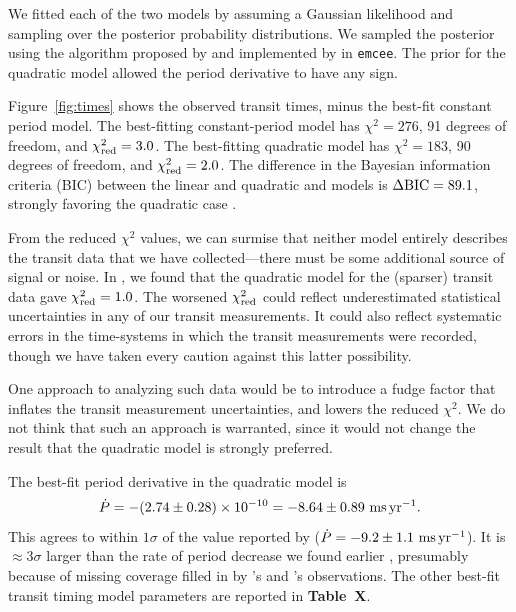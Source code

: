 \documentclass[12pt,twocolumn,tighten]{aastex62}
\begin{document}
We fitted each of the two models by assuming a Gaussian likelihood and
sampling over the posterior probability distributions.  We sampled the
posterior using the algorithm proposed by
\citet{goodman_ensemble_2010} and implemented by
\citet{foreman-mackey_emcee_2013} in \texttt{emcee}.  The prior for
the quadratic model allowed the period derivative to have any sign.

Figure~\ref{fig:times} shows the observed transit times, minus the
best-fit constant period model.  The best-fitting constant-period
model has $\chi^2 = 276$, 91 degrees of freedom, and $\chi^2_{\rm
red}=3.0$.  The best-fitting quadratic model has $\chi^2 = 183$, 90
degrees of freedom, and $\chi^2_{\rm red}=2.0$.  The difference in the
Bayesian information criteria (BIC) between the linear and quadratic
and models is $\Delta {\rm BIC} = 89.1$, strongly favoring the
quadratic case \citep{kass_bayes_1995}.

From the reduced $\chi^2$ values, we can surmise that neither model
entirely describes the transit data that we have collected---there
must be some additional source of signal or noise. In
\citet{bouma_wasp4b_2019}, we found that the quadratic model for the
(sparser) transit data gave $\chi^2_{\rm red}=1.0$.  The worsened
$\chi^2_{\rm red}$ could reflect underestimated statistical
uncertainties in any of our transit measurements.  It could also
reflect systematic errors in the time-systems in which the transit
measurements were recorded, though we have taken every caution against
this latter possibility.

One approach to analyzing such data would be to introduce a fudge
factor that inflates the transit measurement uncertainties, and lowers
the reduced $\chi^2$.  We do not think that such an approach is
warranted, since it would not change the result that the quadratic
model is strongly preferred.

The best-fit period derivative in the quadratic model is
\begin{equation}
\dot{P}
  = - (2.74 \pm 0.28)\times 10^{-10}
  = - 8.64 \pm 0.89~{\rm ms}\,{\rm yr}^{-1}.
  \label{eq:dP_dt_obs}
\end{equation}
This agrees to within $1\sigma$ of the value reported by
\citet{southworth_transit_2019} ($\dot{P} = - 9.2 \pm 1.1~{\rm
ms}\,{\rm yr}^{-1}$).  It is $\approx$3$\sigma$ larger than the rate
of period decrease we found earlier \citep[$- 12.6 \pm 1.2~{\rm
ms}\,{\rm yr}^{-1}$;][]{bouma_wasp4b_2019}, presumably because of
missing coverage filled in by \citeauthor{southworth_transit_2019}'s
and \citeauthor{baluev_2019}'s observations.  The other best-fit
transit timing model parameters are reported in {\bf Table~X}.
\end{document}
